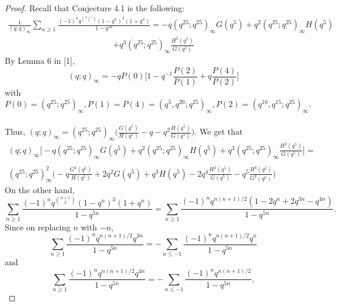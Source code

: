 \documentclass[10pt,reqno]{amsart}
\begin{document}
\begin{proof}
Recall that Conjecture 4.1 is the following:
\begin{align*}
    \displaystyle\frac{1}{(q;q)_{\infty}}\displaystyle\sum_{n\geq 1}\displaystyle\frac{(-1)^nq^{\binom{n+1}{2}}(1-q^n)^3(1+q^n)}{1-q^{5n}}
    =-q(q^{25};q^{25})_{\infty}G(q^5)+q^2(q^{25};q^{25})_{\infty}H(q^5)
\end{align*}
\begin{align}
+q^3(q^{25};q^{25})_{\infty}\displaystyle\frac{H^2(q^5)}{G(q^5)}
\end{align}
By Lemma 6 in [1], 
\begin{equation*}
    (q;q)_{\infty}=-qP(0)\Bigg[1-q^{-1}\displaystyle\frac{P(2)}{P(1)}+q\displaystyle\frac{P(4)}{P(2)}\Bigg]
\end{equation*}
with $P(0)=(q^{25};q^{25})_{\infty},P(1)=P(4)=(q^5,q^{20};q^{25})_{\infty},P(2)=(q^{10},q^{15};q^{25})_{\infty}.$ \\ \\
Thus, $(q;q)_{\infty}=(q^{25};q^{25})_{\infty}\Bigg(\displaystyle\frac{G(q^5)}{H(q^5)}-q-q^2\displaystyle\frac{H(q^5)}{G(q^5)}\Bigg).$ We get that 
\begin{multline}
(q;q)_{\infty}\Bigg[-q(q^{25};q^{25})_{\infty}G(q^5)+q^2(q^{25};q^{25})_{\infty}H(q^5)+q^3(q^{25};q^{25})_{\infty}\displaystyle\frac{H^2(q^5)}{G(q^5)}\Bigg]=\\ \\(q^{25};q^{25})_{\infty}^2\Bigg(-q\displaystyle\frac{G^2(q^5)}{H(q^5)}+2q^2G(q^5)+q^3H(q^5)-2q^4\displaystyle\frac{H^2(q^5)}{G(q^5)}-q^5\displaystyle\frac{H^3(q^5)}{G^2(q^5)}\Bigg)
\end{multline}
On the other hand, 
\begin{equation*}
    \displaystyle\sum_{n\geq 1}\displaystyle\frac{(-1)^nq^{\binom{n+1}{2}}(1-q^n)^3(1+q^n)}{1-q^{5n}}=\displaystyle\sum_{n\geq 1}\displaystyle\frac{(-1)^nq^{n(n+1)/2}(1-2q^n+2q^{3n}-q^{4n})}{1-q^{5n}}.
\end{equation*}
Since on replacing $n$ with $-n$,
\begin{equation*}
    \displaystyle\sum_{n\geq 1}\displaystyle\frac{(-1)^nq^{n(n+1)/2}q^{3n}}{1-q^{5n}}=-\displaystyle\sum_{n\leq -1}\displaystyle\frac{(-1)^nq^{n(n+1)/2}q^{n}}{1-q^{5n}}
\end{equation*}
and
\begin{equation*}
    \displaystyle\sum_{n\geq 1}\displaystyle\frac{(-1)^nq^{n(n+1)/2}q^{4n}}{1-q^{5n}}=-\displaystyle\sum_{n\leq -1}\displaystyle\frac{(-1)^nq^{n(n+1)/2}}{1-q^{5n}},
\end{equation*}

\end{proof}
\end{document}
